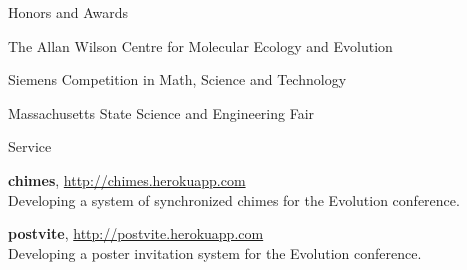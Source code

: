 \documentclass[12pt]{tracv}
\begin{document}
    \newpage

    \begin{columnsection}{Honors and Awards}

        The Allan Wilson Centre for Molecular Ecology and Evolution

        Siemens Competition in Math, Science and Technology

        Massachusetts State Science and Engineering Fair

    \end{columnsection}

    \begin{hangingsection}{Service}

        \hangingentry \textbf{chimes}, \url{http://chimes.herokuapp.com} \\
        Developing a system of synchronized chimes for the Evolution conference.

        \hangingentry \textbf{postvite}, \url{http://postvite.herokuapp.com} \\
        Developing a poster invitation system for the Evolution conference.

    \end{hangingsection}
\end{document}
